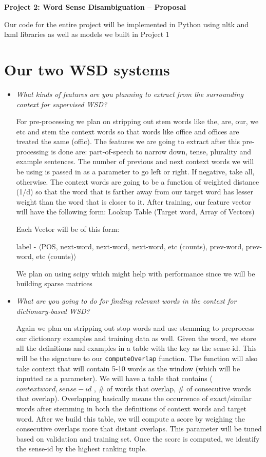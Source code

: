 \documentclass{article}
\begin{document}
\begin{center}\textbf{Project 2: Word Sense Disambiguation -- Proposal}\end{center}

Our code for the entire project will be implemented in Python using nltk and lxml libraries as well as models we built in Project 1

\section{Our two WSD systems}

\begin{itemize}
\item \textit{What kinds of features are you planning to extract from the surrounding context for supervised WSD?}\par

For pre-processing we plan on stripping out stem words like the, are, our, we etc and stem the context words so that words like office and offices are treated the same (offic). The features we are going to extract after this pre-processing is done are: part-of-speech to narrow down, tense, plurality and example sentences. The number of previous and next context words we will be using is passed in as a parameter to go left or right. If negative, take all, otherwise. The context words are going to be a function of weighted distance (1/d) so that the word that is farther away from our target word has lesser weight than the word that is closer to it. After training, our feature vector will have the following form:  
Lookup Table (Target word, Array of Vectors)\par
Each Vector will be of this form: \par
label - $\langle$POS, next-word, next-word, next-word, etc (counts), prev-word, prev-word, etc (counts)$\rangle$

We plan on using scipy which might help with performance since we will be building sparse matrices

\item \textit{What are you going to do for finding relevant words in the context for
dictionary-based WSD?}\par

Again we plan on stripping out stop words and use stemming to preprocess our dictionary examples and training data as well. Given the word, we store all the definitions and examples in a table with the key as the sense-id. This will be the signature to our \texttt{computeOverlap} function. The function will also take context that will contain 5-10 words as the window (which will be inputted as a parameter). We will have a table that contains (\(context word, sense-id\) , \# of words that overlap, \# of consecutive words that overlap). Overlapping basically means the occurrence of exact/similar words after stemming in both the definitions of context words and target word. After we build this table, we will compute a score by weighing the consecutive overlaps more that distant overlaps. This parameter will be tuned based on validation and training set. Once the score is computed, we identify the sense-id by the highest ranking tuple.


\end{itemize}
\end{document}
